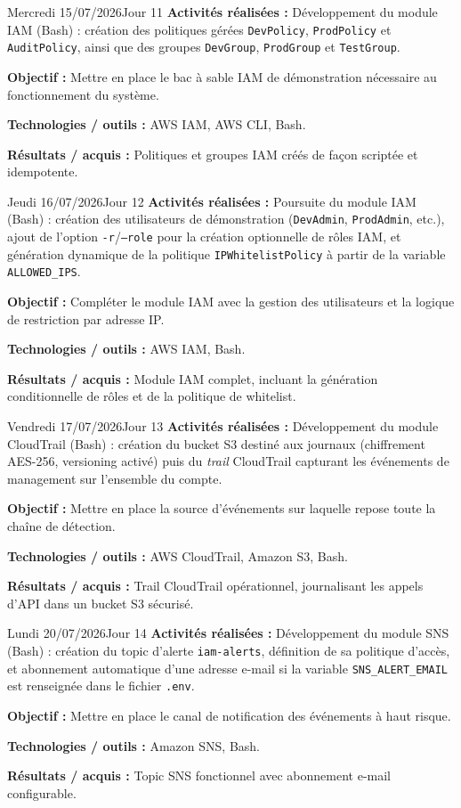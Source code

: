 \documentclass[11pt,a4paper]{article}
\newcommand{\journalfield}[2]{{\color{primaryblue}\textbf{#1 :}} #2\par\smallskip}
\begin{document}
\begin{journalday}{Mercredi 15/07/2026}{Jour 11}
\journalfield{Activités réalisées}{Développement du module IAM (Bash) : création des politiques gérées \texttt{DevPolicy}, \texttt{ProdPolicy} et \texttt{AuditPolicy}, ainsi que des groupes \texttt{DevGroup}, \texttt{ProdGroup} et \texttt{TestGroup}.}
\journalfield{Objectif}{Mettre en place le bac à sable IAM de démonstration nécessaire au fonctionnement du système.}
\journalfield{Technologies / outils}{AWS IAM, AWS CLI, Bash.}
\journalfield{Résultats / acquis}{Politiques et groupes IAM créés de façon scriptée et idempotente.}
\end{journalday}

\begin{journalday}{Jeudi 16/07/2026}{Jour 12}
\journalfield{Activités réalisées}{Poursuite du module IAM (Bash) : création des utilisateurs de démonstration (\texttt{DevAdmin}, \texttt{ProdAdmin}, etc.), ajout de l'option \texttt{-r}/\texttt{--role} pour la création optionnelle de rôles IAM, et génération dynamique de la politique \texttt{IPWhitelistPolicy} à partir de la variable \texttt{ALLOWED\_IPS}.}
\journalfield{Objectif}{Compléter le module IAM avec la gestion des utilisateurs et la logique de restriction par adresse IP.}
\journalfield{Technologies / outils}{AWS IAM, Bash.}
\journalfield{Résultats / acquis}{Module IAM complet, incluant la génération conditionnelle de rôles et de la politique de whitelist.}
\end{journalday}

\begin{journalday}{Vendredi 17/07/2026}{Jour 13}
\journalfield{Activités réalisées}{Développement du module CloudTrail (Bash) : création du bucket S3 destiné aux journaux (chiffrement AES-256, versioning activé) puis du \textit{trail} CloudTrail capturant les événements de management sur l'ensemble du compte.}
\journalfield{Objectif}{Mettre en place la source d'événements sur laquelle repose toute la chaîne de détection.}
\journalfield{Technologies / outils}{AWS CloudTrail, Amazon S3, Bash.}
\journalfield{Résultats / acquis}{Trail CloudTrail opérationnel, journalisant les appels d'API dans un bucket S3 sécurisé.}
\end{journalday}

\begin{journalday}{Lundi 20/07/2026}{Jour 14}
\journalfield{Activités réalisées}{Développement du module SNS (Bash) : création du topic d'alerte \texttt{iam-alerts}, définition de sa politique d'accès, et abonnement automatique d'une adresse e-mail si la variable \texttt{SNS\_ALERT\_EMAIL} est renseignée dans le fichier \texttt{.env}.}
\journalfield{Objectif}{Mettre en place le canal de notification des événements à haut risque.}
\journalfield{Technologies / outils}{Amazon SNS, Bash.}
\journalfield{Résultats / acquis}{Topic SNS fonctionnel avec abonnement e-mail configurable.}
\end{journalday}
\end{document}
